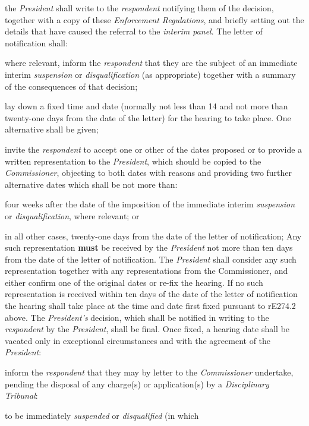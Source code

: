 the \emph{President} shall write to the \emph{respondent} notifying them
of the decision, together with a copy of these \emph{Enforcement
Regulations}, and briefly setting out the details that have caused the
referral to the \emph{interim panel}. The letter of notification
shall:\\\nl \item where relevant, inform the \emph{respondent} that they are the
subject of an immediate
interim \emph{suspension} or \emph{disqualification} (as appropriate)
together with a summary of the consequences of that decision;\item lay down a fixed time and date (normally not less than 14 and not
more than twenty-one days from the date of the letter) for the hearing
to take place. One alternative shall be given;\item invite the \emph{respondent} to accept one or other of the dates
proposed or to provide a written\emph{ }representation to
the \emph{President}, which should be copied to the \emph{Commissioner},
objecting to both dates with reasons and providing two further
alternative dates which shall be not more than:\al
\item  four weeks after the date of the imposition of the immediate
interim \emph{suspension} or \emph{disqualification}, where relevant;
or\\
\item in all other cases, twenty-one days from the date of the letter of
notification;\la
Any such representation  \textcolor{myred}{\textbf{must}} be received by the \emph{President} not
more than ten days from the date of the letter of notification.
The \emph{President} shall consider any such representation together
with any representations from the Commissioner, and either confirm one
of the original dates or re-fix the hearing. If no such representation
is received within ten days of the date of the letter of notification
the hearing shall take place at the time and date first fixed pursuant
to rE274.2 above. The \emph{President's} decision, which shall be
notified in writing to the \emph{respondent} by the \emph{President},
shall be final. Once fixed, a hearing date shall be vacated only in
exceptional circumstances and with the agreement of
the \emph{President}:
\item inform the \emph{respondent} that they may by letter to
the \emph{Commissioner} undertake, pending the disposal of any charge(s)
or application(s) by a \emph{Disciplinary Tribunal}:
\al \item to be immediately \emph{suspended} or \emph{disqualified} (in which
